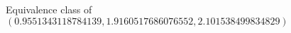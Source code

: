 \documentclass[preview]{standalone}
\begin{document}
\begin{center}
Equivalence class of $(0.9551343118784139, 1.9160517686076552, 2.101538499834829)$
\end{center}
\end{document}
